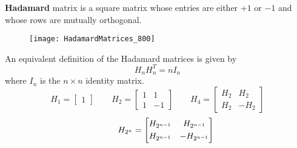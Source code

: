 	\textbf{Hadamard} matrix is a square matrix whose entries are either $+1$ or $-1$ and whose rows are mutually orthogonal.
\begin{figure}[h]
\centering
\texttt{[image: HadamardMatrices\_800]}
\caption{}
\label{fig:HadamardMatrices_800}
\end{figure}


	An equivalent definition of the Hadamard matrices is given by 
	$$ H_{n} H_{n}^T = n  I_{n} $$
	where $I_{n}$ is the $n \times n$ identity matrix.
	$$
	H_{1} = \begin{bmatrix}
	1
	\end{bmatrix}
	\qquad
	H_{2} = \begin{bmatrix}
	1 & 1           \\[0.3em]
	1& -1
	\end{bmatrix}	
	\qquad
	H_{4} = \begin{bmatrix}
	H_{2} & H_{2}           \\[0.3em]
	H_{2}& -H_{2}
	\end{bmatrix}	
	$$
	$$
	\centering
	\qquad
	H_{2^{n}} = \begin{bmatrix}
	H_{2^{n-1}} & H_{2^{n-1}}           \\[0.3em]
	H_{2^{n-1}}& -H_{2^{n-1}}            
	\end{bmatrix}	
	$$





